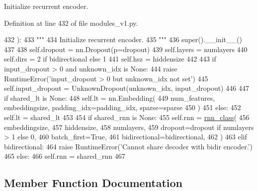 \begin{DoxyVerb}Initialize recurrent encoder.
\end{DoxyVerb}
 

Definition at line 432 of file modules\+\_\+v1.\+py.


\begin{DoxyCode}
432     ):
433         \textcolor{stringliteral}{"""}
434 \textcolor{stringliteral}{        Initialize recurrent encoder.}
435 \textcolor{stringliteral}{        """}
436         super().\_\_init\_\_()
437 
438         self.dropout = nn.Dropout(p=dropout)
439         self.layers = numlayers
440         self.dirs = 2 \textcolor{keywordflow}{if} bidirectional \textcolor{keywordflow}{else} 1
441         self.hsz = hiddensize
442 
443         \textcolor{keywordflow}{if} input\_dropout > 0 \textcolor{keywordflow}{and} unknown\_idx \textcolor{keywordflow}{is} \textcolor{keywordtype}{None}:
444             \textcolor{keywordflow}{raise} RuntimeError(\textcolor{stringliteral}{'input\_dropout > 0 but unknown\_idx not set'})
445         self.input\_dropout = UnknownDropout(unknown\_idx, input\_dropout)
446 
447         \textcolor{keywordflow}{if} shared\_lt \textcolor{keywordflow}{is} \textcolor{keywordtype}{None}:
448             self.lt = nn.Embedding(
449                 num\_features, embeddingsize, padding\_idx=padding\_idx, sparse=sparse
450             )
451         \textcolor{keywordflow}{else}:
452             self.lt = shared\_lt
453 
454         \textcolor{keywordflow}{if} shared\_rnn \textcolor{keywordflow}{is} \textcolor{keywordtype}{None}:
455             self.rnn = \hyperlink{namespaceseq2seq_1_1train_a1b062073c766f1d34a67f572ef256ba0}{rnn\_class}(
456                 embeddingsize,
457                 hiddensize,
458                 numlayers,
459                 dropout=dropout \textcolor{keywordflow}{if} numlayers > 1 \textcolor{keywordflow}{else} 0,
460                 batch\_first=\textcolor{keyword}{True},
461                 bidirectional=bidirectional,
462             )
463         \textcolor{keywordflow}{elif} bidirectional:
464             \textcolor{keywordflow}{raise} RuntimeError(\textcolor{stringliteral}{'Cannot share decoder with bidir encoder.'})
465         \textcolor{keywordflow}{else}:
466             self.rnn = shared\_rnn
467 
\end{DoxyCode}


\subsection{Member Function Documentation}
\mbox{\label{classparlai_1_1agents_1_1legacy__agents_1_1seq2seq_1_1modules__v1_1_1RNNEncoder_ab9ab650f24d8ba6407261418f480a8f5}} 
